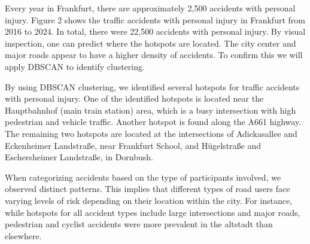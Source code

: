 \documentclass[10pt,a4paper]{article} %
\begin{document}
Every year in Frankfurt, there are approximately 2,500 accidents with personal injury. Figure 2 shows the traffic accidents with personal injury in Frankfurt from 2016 to 2024. In total, there were 22,500 accidents with personal injury. By visual inspection, one can predict where the hotspots are located. The city center and major roads appear to have a higher density of accidents. To confirm this we will apply DBSCAN to identify clustering.\\
\par
By using DBSCAN clustering, we identified several hotspots for traffic accidents with personal injury. One of the identified hotspots is located near the Hauptbahnhof (main train station) area, which is a busy intersection with high pedestrian and vehicle traffic. Another hotspot is found along the A661 highway. The remaining two hotspots are located at the intersections of Adickasallee and Eckenheimer Landstraße, near Frankfurt School, and Hügelstraße and Eschersheimer Landstraße, in Dornbush.\\
\par
When categorizing accidents based on the type of participants involved, we observed distinct patterns. This implies that different types of road users face varying levels of risk depending on their location within the city. For instance, while hotspots for all accident types include large intersections and major roads, pedestrian and cyclist accidents were more prevalent in the altstadt than elsewhere.\\
\end{document}
